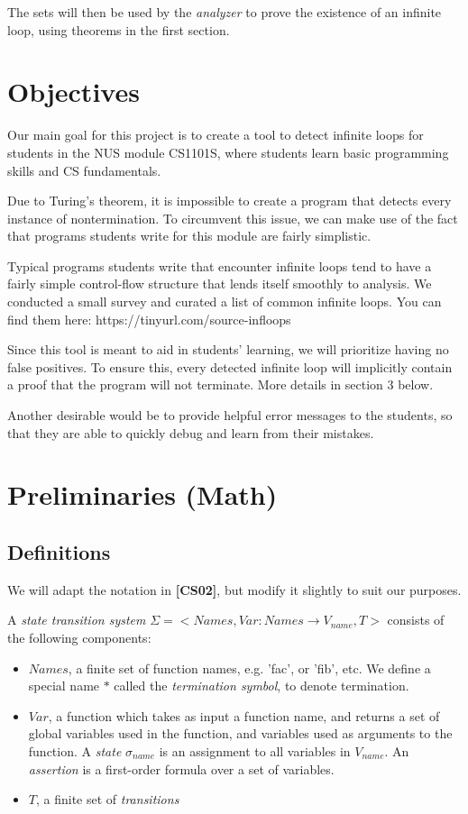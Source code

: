 The sets will then be used by the {\it analyzer} to prove the existence of an infinite loop, using theorems in the first section.

\section{Objectives}
Our main goal for this project is to create a tool to detect infinite loops for students in the NUS module CS1101S, where students learn basic programming skills and CS fundamentals.

Due to Turing's theorem, it is impossible to create a program that detects every instance of nontermination. To circumvent this issue, we can make use of the fact that programs students write for this module are fairly simplistic.

Typical programs students write that encounter infinite loops tend to have a fairly simple control-flow structure that lends itself smoothly to analysis.
We conducted a small survey and curated a list of common infinite loops. You can find them here: https://tinyurl.com/source-infloops

Since this tool is meant to aid in students' learning, we will prioritize having no false positives. To ensure this, every detected infinite loop will implicitly contain a proof that the program will not terminate. More details in section 3 below.

Another desirable would be to provide helpful error messages to the students, so that they are able to quickly debug and learn from their mistakes.
\section{Preliminaries (Math)}

\subsection{Definitions}
We will adapt the notation in \textbf{[CS02]}, but modify it slightly to suit our purposes.

A {\it state transition system} $\Sigma=<Names,Var : Names\to V_{name}, T>$  consists of the following components:

\begin{itemize}
  \item $Names$, a finite set of function names, e.g. 'fac', or 'fib', etc. We define a special name $*$ called the {\it termination symbol}, to denote termination.

  \item $Var$, a function which takes as input a function name, and returns a set of global variables used in the function, and variables used as arguments to the function. A {\it state} $\sigma_{name}$ is an assignment to all variables in $V_{name}$. An {\it assertion} is a first-order formula over a set of variables.

  \item $T$, a finite set of {\it transitions}
\end {itemize}

